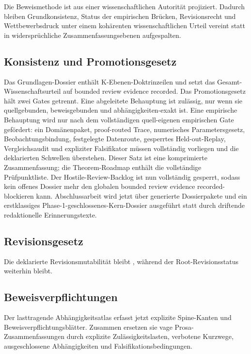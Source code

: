 Die Beweismethode ist aus einer wissenschaftlichen Autorität projiziert. Dadurch bleiben Grundkonsistenz, Status der empirischen Brücken, Revisionsrecht und Wettbewerbsdruck unter einem kohärenten wissenschaftlichen Urteil vereint statt in widersprüchliche Zusammenfassungsebenen aufgespalten.

\subsection{Konsistenz und Promotionsgesetz}
Das Grundlagen-Dossier enthält  K-Ebenen-Doktrinzeilen und setzt das Gesamt-Wissenschaftsurteil auf bounded review evidence recorded.
Das Promotionsgesetz hält zwei Gates getrennt. Eine abgeleitete Behauptung ist zulässig, nur wenn sie quellgebunden, beweisgebunden und abhängigkeiten-exakt ist. Eine empirische Behauptung wird nur nach dem vollständigen quell-eigenen empirischen Gate gefördert: ein Domänenpaket, proof-routed Trace, numerisches Parametersgesetz, Beobachtungsbindung, festgelegte Datenroute, gesperrtes Held-out-Replay, Vergleichsaudit und expliziter Falsifikator müssen vollständig vorliegen und die deklarierten Schwellen überstehen. Dieser Satz ist eine komprimierte Zusammenfassung; die Theorem-Roadmap enthält die vollständige Prüfpunktliste.
Der Hostile-Review-Backlog ist nun vollständig gesperrt, sodass kein offenes Dossier mehr den globalen bounded review evidence recorded-blockieren kann.
Abschlussarbeit wird jetzt über generierte Dossierpakete und ein erstklassiges Phase-1-geschlossenes-Kern-Dossier ausgeführt statt durch driftende redaktionelle Erinnerungstexte.

\subsection{Revisionsgesetz}
Die deklarierte Revisionsmutabilität bleibt , während der Root-Revisionsstatus weiterhin  bleibt.

\subsection{Beweisverpflichtungen}
Der lasttragende Abhängigkeitsatlas erfasst jetzt  explizite Spine-Kanten und  Beweisverpflichtungsblätter. Zusammen ersetzen sie vage Prosa-Zusammenfassungen durch explizite Zulässigkeitslasten, verbotene Kurzwege, ausgeschlossene Abhängigkeiten und Falsifikationsbedingungen.

